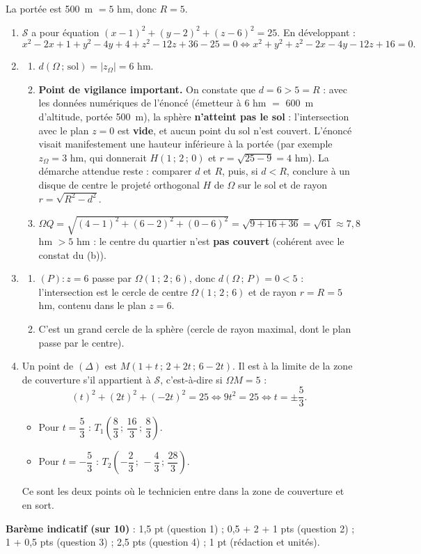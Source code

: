 \documentclass[11pt]{article}
\newcommand{\cle}[1]{{\popxbold\color{popdark}#1}}
\begin{document}
\begin{corrige}
La portée est \SI{500}{m} $=5$ hm, donc $R=5$.
\begin{enumerate}
\item $\mathcal{S}$ a pour équation $(x-1)^2+(y-2)^2+(z-6)^2=25$. En développant :
\[x^2-2x+1+y^2-4y+4+z^2-12z+36-25=0 \iff x^2+y^2+z^2-2x-4y-12z+16=0.\]
\item 
\begin{enumerate}
\item $d(\Omega\,;\,\text{sol})=|z_\Omega|=6$ hm.
\item \textbf{Point de vigilance important.} On constate que $d=6>5=R$ : avec les données numériques de l'énoncé (émetteur à $6$ hm $=$ \SI{600}{m} d'altitude, portée \SI{500}{m}), la sphère \textbf{n'atteint pas le sol} : l'intersection avec le plan $z=0$ est \textbf{vide}, et aucun point du sol n'est couvert. L'énoncé visait manifestement une hauteur inférieure à la portée (par exemple $z_\Omega=3$ hm, qui donnerait $H(1\,;\,2\,;\,0)$ et $r=\sqrt{25-9}=4$ hm). La démarche attendue reste : comparer $d$ et $R$, puis, si $d<R$, conclure à un disque de centre le projeté orthogonal $H$ de $\Omega$ sur le sol et de rayon $r=\sqrt{R^2-d^2}$.
\item $\Omega Q=\sqrt{(4-1)^2+(6-2)^2+(0-6)^2}=\sqrt{9+16+36}=\sqrt{61}\approx 7{,}8$ hm $>5$ hm : le centre du quartier n'est \textbf{pas couvert} (cohérent avec le constat du (b)).
\end{enumerate}
\item 
\begin{enumerate}
\item $(P):z=6$ passe par $\Omega(1\,;\,2\,;\,6)$, donc $d(\Omega\,;\,P)=0<5$ : l'intersection est le cercle de centre $\Omega(1\,;\,2\,;\,6)$ et de rayon $r=R=5$ hm, contenu dans le plan $z=6$.
\item C'est un \cle{grand cercle} de la sphère (cercle de rayon maximal, dont le plan passe par le centre).
\end{enumerate}
\item Un point de $(\Delta)$ est $M(1+t\,;\,2+2t\,;\,6-2t)$. Il est à la limite de la zone de couverture s'il appartient à $\mathcal{S}$, c'est-à-dire si $\Omega M=5$ :
\[(t)^2+(2t)^2+(-2t)^2=25 \iff 9t^2=25 \iff t=\pm\dfrac{5}{3}.\]
\begin{itemize}
\item Pour $t=\dfrac{5}{3}$ : $T_1\left(\dfrac{8}{3}\,;\,\dfrac{16}{3}\,;\,\dfrac{8}{3}\right)$.
\item Pour $t=-\dfrac{5}{3}$ : $T_2\left(-\dfrac{2}{3}\,;\,-\dfrac{4}{3}\,;\,\dfrac{28}{3}\right)$.
\end{itemize}
Ce sont les deux points où le technicien entre dans la zone de couverture et en sort.
\end{enumerate}
\textbf{Barème indicatif (sur 10)} : 1,5 pt (question 1) ; 0,5 + 2 + 1 pts (question 2) ; 1 + 0,5 pts (question 3) ; 2,5 pts (question 4) ; 1 pt (rédaction et unités).


\end{corrige}
\end{document}

